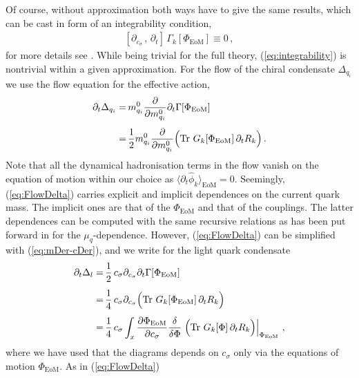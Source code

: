 \documentclass[%
reprint,
superscriptaddress,
showpacs,preprintnumbers,
 amsmath,amssymb,
 aps,
prd,
]{revtex4-1}
\newcommand{\Tr}{\ensuremath{\operatorname{Tr}}}
\def\eq#1{(\ref{#1})}
\begin{document}
Of course, without approximation both ways have to give the same
results, which can be cast in form of an integrability condition,
%
\begin{align}\label{eq:integrability}
  \left[ \partial_{c_\sigma}\,,\, \partial_t\right]\,
  \Gamma_k[\Phi_\textrm{EoM}] \equiv 0\,,
\end{align}
%
for more details see \cite{Pawlowski:2005xe, Pawlowski:2015mlf,
  Braun:2018svj}. While being trivial for the full theory,
\eq{eq:integrability} is nontrivial within a given approximation. For
the flow of the chiral condensate $\Delta_{q_i}$ we use the flow
equation for the effective action,
% 
\begin{align}\nonumber 
  \partial_t \Delta_{q_i} =&\, m^0_{q_i}\frac{\partial}{\partial
                             m^0_{q_i}}\partial_t \Gamma[
                             \Phi_\textrm{EoM}]\\[1ex] 
  = &\,\frac12 m^0_{q_i}\frac{\partial}{\partial
      m^0_{q_i}}  \Bigl( \Tr\, G_k[
      \Phi_\textrm{EoM}]\,\partial_t R_k\Bigr)\,.
\label{eq:FlowDelta}\end{align}
Note that all the dynamical hadronisation terms in the flow vanish on
the equation of motion within our choice as
$\langle \partial_t \hat{\phi}_k\rangle_{\textrm{EoM} }=0$. Seemingly,
\eq{eq:FlowDelta} carries explicit and implicit dependences on the
current quark mass. The implicit ones are that of the
$\Phi_{\textrm{EoM}}$ and that of the couplings. The latter
dependences can be computed with the same recursive relations as has
been put forward in \cite{Fu:2015naa} for the
$\mu_q$-dependence. However, \eq{eq:FlowDelta} can be simplified with
\eq{eq:mDer-cDer}, and we write for the light quark condensate
%
\begin{align}\nonumber 
  \partial_t \Delta_{l} = &\,\frac12 \,c_\sigma
                            \partial_{c_\sigma} \partial_t
                            \Gamma[\Phi_{\textrm{EoM}}]
  \\[1ex]\nonumber 
  =&\,\frac14 \, c_\sigma
     \partial_{c_\sigma}  \Bigl(\Tr\,G_k[\Phi_\textrm{EoM}]
     \,\partial_t R_k\Bigr)\\[1ex]
  =&\,\frac14 \, c_\sigma
     \int_x \frac{\partial \Phi_{\textrm{EoM}}}
     {\partial {c_\sigma}}
     \frac{\delta}{\delta \Phi}
     \left. \Bigl(\Tr\,G_k[\Phi] \,\partial_t R_k
     \Bigr)\right|_{\Phi_\textrm{EoM}} \,,
\label{eq:FlowDeltalc}\end{align}
%
where we have used that the diagrams depends on $c_\sigma$ only via
the equations of motion $\Phi_\textrm{EoM}$. As in \eq{eq:FlowDelta}
\end{document}
